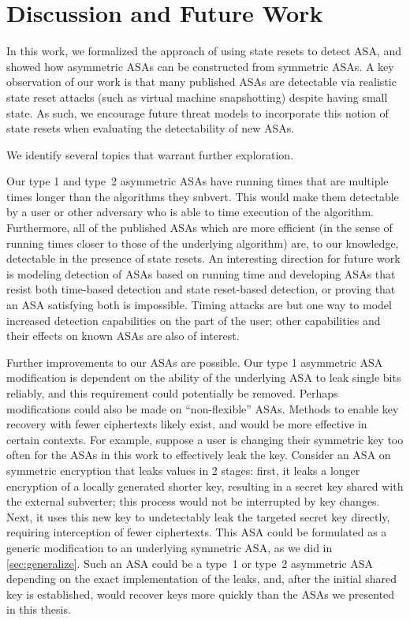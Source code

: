 \chapter{Discussion and Future Work}
In this work, we formalized the approach of using state resets to detect ASA, and showed how asymmetric ASAs can be constructed from symmetric ASAs. A key observation of our work is that many published ASAs are detectable via realistic state reset attacks (such as virtual machine snapshotting) despite having small state.  As such, we encourage future threat models to incorporate this notion of state resets when evaluating the detectability of new ASAs.

We identify several topics that warrant further exploration.

Our type 1 and type~2 asymmetric ASAs have running times that are multiple times longer than the algorithms they subvert. This would make them detectable by a user or other adversary who is able to time execution of the algorithm. Furthermore, all of the published ASAs which are more efficient (in the sense of running times closer to those of the underlying algorithm) are, to our knowledge, detectable in the presence of state resets. An interesting direction for future work is modeling detection of ASAs based on running time and developing ASAs that resist both time-based detection and state reset-based detection, or proving that an ASA satisfying both is impossible. Timing attacks are but one way to model increased detection capabilities on the part of the user; other capabilities and their effects on known ASAs are also of interest.

Further improvements to our ASAs are possible. Our type 1 asymmetric ASA modification is dependent on the ability of the underlying ASA to leak single bits reliably, and this requirement could potentially be removed. Perhaps modifications could also be made on ``non-flexible'' ASAs. Methods to enable key recovery with fewer ciphertexts likely exist, and would be more effective in certain contexts. For example, suppose a user is changing their symmetric key too often for the ASAs in this work to effectively leak the key. Consider an ASA on symmetric encryption that leaks values in 2 stages: first, it leaks a longer encryption of a locally generated shorter key, resulting in a secret key shared with the external subverter; this process would not be interrupted by key changes. Next, it uses this new key to undetectably leak the targeted secret key directly, requiring interception of fewer ciphertexts. This ASA could be formulated as a generic modification to an underlying symmetric ASA, as we did in \autoref{sec:generalize}. Such an ASA could be a type~1 or type~2 asymmetric ASA depending on the exact implementation of the leaks, and, after the initial shared key is established, would recover keys more quickly than the ASAs we presented in this thesis.

